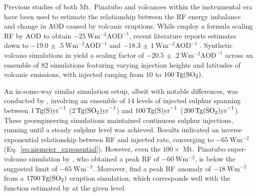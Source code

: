 \documentclass[draft]{agujournal2019}
\newcommand{\iso}[1][i]{{#1}njected \ce{SO2}}
\begin{document}
Previous studies of both Mt.\ Pinatubo \cite{mills2017,hansen2005} and volcanoes within
the instrumental era \cite{gregory2016} have been used to estimate the relationship
between the RF energy imbalance and change in AOD caused by volcanic
eruptions. While  employ a formula scaling RF by AOD to
obtain \(\SI{-25}{\watt\metre^{-2}\mathrm{AOD}^{-1}}\), recent literature reports
estimates down to \(\SI{-19.0(5)}{\watt\metre^{-2}\mathrm{AOD}^{-1}}\)
\cite{gregory2016} and \(\SI{-18.3(10)}{\watt\metre^{-2}\mathrm{AOD}^{-1}}\)
\cite{mills2017}. Synthetic volcano simulations in  yield a scaling
factor of \(\SI{-20.5(2)}{\watt\metre^{-2}\mathrm{AOD}^{-1}}\) across an ensemble of
\(82\) simulations featuring varying injection heights and latitudes of volcanic
emissions, with \iso{} ranging from \(10\) to \(\SI{100}{\tera\gram(\ce{SO2})}\).

An in-some-way similar simulation setup, albeit with notable differences, was conducted
by , involving an ensemble of \(14\) levels of injected sulphur
spanning between \(\SI{1}{\tera\gram(\ce{S})\mathrm{yr}^{-1}}\)
(\(\SI{2}{\tera\gram(\ce{SO2})\mathrm{yr}^{-1}}\)) and
\(\SI{100}{\tera\gram(\ce{S})\mathrm{yr}^{-1}}\)
(\(\SI{200}{\tera\gram(\ce{SO2})\mathrm{yr}^{-1}}\)). These geoengineering simulations
maintained continuous sulphur injections, running until a steady sulphur level was
achieved. Results indicated an inverse exponential relationship between RF and
\iso{} rate, converging to \(\SI{-65}{\watt\metre^{-2}}\)
(Eq.~\ref{eq:niemeier_exponential}). However, even the \(100\times\) Mt.\ Pinatubo
super-volcano simulation by , who obtained a peak RF of
\(\SI{-60}{\watt\metre^{-2}}\), is below the suggested limit of
\(\SI{-65}{\watt\metre^{-2}}\). Moreover,  find a peak RF
anomaly of \(\SI{-18}{\watt\metre^{-2}}\) from a \(\SI{1700}{\tera\gram(\ce{SO2})}\)
eruption simulation, which corresponds well with the function estimated by
 at the given  level.
\end{document}
